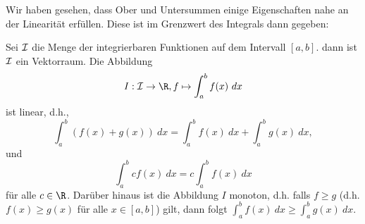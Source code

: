 \documentclass[letterpaper,10pt,english]{jupyterBook}
\begin{document}
Wir haben gesehen, dass Ober  und Untersummen einige Eigenschaften nahe an der Linearität erfüllen. Diese ist im Grenzwert des Integrals dann gegeben:
\label{integration/riemann:lemma-2}
\begin{lemma}{}{}



Sei \({\cal I}\) die Menge der integrierbaren Funktionen auf dem Intervall \([a,b]\). dann ist \({\cal I}\) ein Vektorraum. Die Abbildung
\begin{equation*}
I: {\cal I} \rightarrow \R, f \mapsto \int_a^b f(x)~dx
\end{equation*}
ist linear, d.h.,
\begin{equation*}
 \int_a^b (f(x)+g(x))~dx = \int_a^b f(x)~dx + \int_a^b g(x)~dx,
\end{equation*}
und
\begin{equation*}
 \int_a^b c f(x)~dx = c \int_a^b f(x)~dx
\end{equation*}
für alle \(c \in \R\). Darüber hinaus ist die Abbildung \(I\) monoton, d.h. falls \(f \geq g\) (d.h. \(f(x) \geq g(x)\) für alle \(x\in[a,b]\)) gilt, dann folgt \(\int_a^b f(x)~dx \geq \int_a^b g(x)~dx. \)
\end{lemma}
\end{document}
